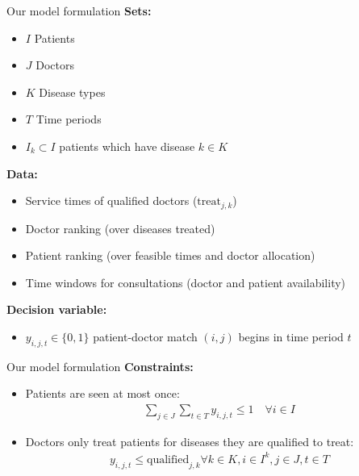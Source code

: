 \documentclass{beamer}
\begin{document}
\begin{frame}{Our model formulation}
\textbf{Sets:}    
\begin{itemize}
    \item $I$ Patients
    \item $J$ Doctors
    \item $K$ Disease types
    \item $T$ Time periods
    \item $I_k \subset I$ patients which have disease $k\in K$
    \end{itemize}
\textbf{Data:}
\begin{itemize}
    \item Service times of qualified doctors ($\textrm{treat}_{j,k}$)
    \item Doctor ranking (over diseases treated)
    \item Patient ranking (over feasible times and doctor allocation)
    \item Time windows for consultations (doctor and patient availability)
\end{itemize}
\textbf{Decision variable:}
\begin{itemize}
    \item $y_{i,j,t}\in\{0,1\}$  patient-doctor match $(i,j)$ begins in time period $t$
\end{itemize}
\end{frame}

\begin{frame}{Our model formulation}
\textbf{Constraints:}    
\begin{itemize}
    \item Patients are seen at most once:
     \begin{gather*}
         \sum_{j\in J} \sum_{t\in T} y_{i, j, t}  \le 1 \quad \forall i \in I
     \end{gather*} 
     \item Doctors only treat patients for diseases they are qualified to treat:
     \begin{gather*}
          y_{i, j, t} \le \text{qualified}_{j,k} \forall k \in K, i \in I^k, j \in J, t \in T
     \end{gather*}
\end{itemize}
\end{frame}
\end{document}
